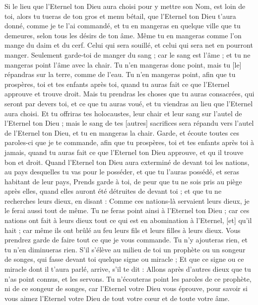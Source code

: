 \begin{multicols}{2}
Si le lieu que l'Eternel ton Dieu aura choisi pour y mettre son Nom, est loin de toi, alors tu tueras de ton gros et menu bétail, que l'Eternel ton Dieu t'aura donné, comme je te l'ai commandé, et tu en mangeras en quelque ville que tu demeures, selon tous les désirs de ton âme.
Même tu en mangeras comme l'on mange du daim et du cerf. Celui qui sera souillé, et celui qui sera net en pourront manger.
Seulement garde-toi de manger du sang ; car le sang est l'âme ; et tu ne mangeras point l'âme avec la chair.
Tu n'en mangeras donc point, mais tu [le] répandras sur la terre, comme de l'eau.
Tu n'en mangeras point, afin que tu prospères, toi et tes enfants après toi, quand tu auras fait ce que l'Eternel approuve et trouve droit.
Mais tu prendras les choses que tu auras consacrées, qui seront par devers toi, et ce que tu auras voué, et tu viendras au lieu que l'Eternel aura choisi.
Et tu offriras tes holocaustes, leur chair et leur sang sur l'autel de l'Eternel ton Dieu ; mais le sang de tes [autres] sacrifices sera répandu vers l'autel de l'Eternel ton Dieu, et tu en mangeras la chair.
Garde, et écoute toutes ces paroles-ci que je te commande, afin que tu prospères, toi et tes enfants après toi à jamais, quand tu auras fait ce que l'Eternel ton Dieu approuve, et qu il trouve bon et droit.
Quand l'Eternel ton Dieu aura exterminé de devant toi les nations, au pays desquelles tu vas pour le posséder, et que tu l'auras possédé, et seras habitant de leur pays,
Prends garde à toi, de peur que tu ne sois pris au piège après elles, quand elles auront été détruites de devant toi ; et que tu ne recherches leurs dieux, en disant : Comme ces nations-là servaient leurs dieux, je le ferai aussi tout de même.
Tu ne feras point ainsi à l'Eternel ton Dieu ; car ces nations ont fait à leurs dieux tout ce qui est en abomination à l'Eternel, [et] qu'il hait ; car même ils ont brûlé au feu leurs fils et leurs filles à leurs dieux.
Vous prendrez garde de faire tout ce que je vous commande. Tu n'y ajouteras rien, et tu n'en diminueras rien.
\VerseOne{}S'il s'élève au milieu de toi un prophète ou un songeur de songes, qui fasse devant toi quelque signe ou miracle ;
Et que ce signe ou ce miracle dont il t'aura parlé, arrive, s'il te dit : Allons après d'autres dieux que tu n'as point connus, et les servons.
Tu n'écouteras point les paroles de ce prophète, ni de ce songeur de songes, car l'Eternel votre Dieu vous éprouve, pour savoir si vous aimez l'Eternel votre Dieu de tout votre cœur et de toute votre âme.

\end{multicols}
